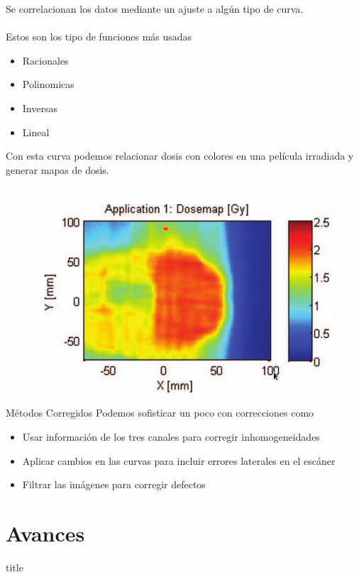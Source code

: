 \documentclass[12pt]{beamer}
\begin{document}
\begin{frame}
	Se correlacionan los datos mediante un ajuste a algún tipo de curva.\\~\\
	Estos son los tipo de funciones más usadas
	\begin{itemize}
		\item Racionales 
		\item Polinomicas
		\item Inversas
		\item Lineal
	\end{itemize}
\end{frame}

\begin{frame}
	Con esta curva podemos relacionar dosis con colores en una película irradiada y generar mapas de dosis.\\~\\
	\begin{figure}
		\centering
		\includegraphics[width=0.7\linewidth]{images/dosemap.png}
	\end{figure}
\end{frame}


\begin{frame}{Métodos Corregidos}
Podemos sofisticar un poco con correcciones como 
\begin{itemize}
	\item Usar información de los tres canales para corregir inhomogeneidades
	\item Aplicar cambios en las curvas para incluir errores laterales en el escáner
	\item Filtrar las imágenes para corregir defectos
\end{itemize}
\end{frame}

\section{Avances}
\begin{frame}
	\vfill
	\centering
	\begin{beamercolorbox}[sep=8pt,center,shadow=true,rounded=true]{title}
		\insertsectionhead\par%
	\end{beamercolorbox}
	\vfill
\end{frame}
\end{document}
